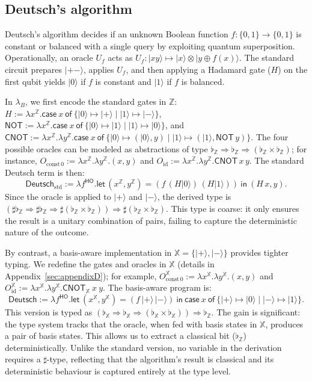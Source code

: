 \documentclass[a4paper,UKenglish,numberwithinsect,pdfa,anonymous]{lipics-v2021}
\theoremstyle{restatestyle}
\newcommand\ket[1]{\ensuremath{|#1\rangle}}
\newcommand\AbsBasis{\ensuremath{\mathsf{H\!O}}}
\def\Pair#1#2{(#1,#2)} %
\def\Lam#1#2#3{\lambda#1^{#2}{.}#3} %
\def\letkeyword{\mathsf{let}}
\def\inkeyword{\mathsf{in}}
\def\LetP#1#2#3#4#5#6{\letkeyword\,\Pair{#1^{#2}}{#3^{#4}}=#5~\inkeyword~#6}
\def\case#1#2#3#4#5{\ensuremath{\mathsf{case}~#1~\mathsf{of}~\{#2\mapsto #4 \mid #3\mapsto #5\}}}
\def\Arr{\Rightarrow}
\newcommand\B{\mathbb Z}
\newcommand\XB{\mathbb X}
\newcommand{\cnotXB}[2]{\mathsf{CNOT}_{\XB}\ #1\ #2}
\newcommand{\lambdaB}{\lambda_B}
\newcommand\basis[1]{\ensuremath{\flat_{#1}}}
\begin{document}
\subsection{Deutsch's algorithm}\label{subsec:deutsch}
Deutsch's algorithm decides if an unknown Boolean function $f:\{0,1\}\to\{0,1\}$ is constant or balanced with a single query by exploiting quantum superposition. Operationally, an oracle $U_f$ acts as $U_f:\ket{xy}\mapsto \ket{x}\otimes\ket{y\oplus f(x)}$. The standard circuit prepares $\ket{+-}$, applies $U_f$, and then applying a Hadamard gate ($H$) on the first qubit yields $\ket{0}$ if $f$ is constant and $\ket{1}$ if $f$ is balanced.

In $\lambdaB$, we first encode the standard gates in $\B$: 
$H := \Lam{x}{\B}{\case{x}{\ket{0}}{\ket{1}}{\ket{+}}{\ket{-}}}$, 
$\mathsf{NOT} := \Lam{x}{\B}{\case{x}{\ket{0}}{\ket{1}}{\ket{1}}{\ket{0}}}$, and 
$\mathsf{CNOT} := \Lam{x}{\B}{\Lam{y}{\B}{\case{x}{\ket{0}}{\ket{1}}{\Pair{\ket{0}}{y}}{\Pair{\ket{1}}{\mathsf{NOT}\,y}}}}$.
The four possible oracles can be modeled as abstractions of type $\basis{\B}\Arr\basis{\B}\Arr(\basis{\B}\times\basis{\B})$; for instance, 
$O_{\mathrm{const}\,0} := \Lam{x}{\B}{\Lam{y}{\B}{\Pair{x}{y}}}$ and 
$O_{\mathrm{id}} := \Lam{x}{\B}{\Lam{y}{\B}{\mathsf{CNOT}\,x\,y}}$. 
The standard Deutsch term is then:
\[
  \mathsf{Deutsch}_{\mathrm{std}} :=
  \Lam{f}{\AbsBasis}{
    \LetP{x}{\B}{y}{\B}{(f\,(H\ket{0})\,(H\ket{1}))}{\Pair{H\,x}{y}}
  }.
\]
Since the oracle is applied to $\ket{+}$ and $\ket{-}$, the derived type is 
$(\sharp\basis{\B}\Arr\sharp\basis{\B}\Arr \sharp(\basis{\B}\times\basis{\B})) \Arr \sharp(\basis{\B}\times\basis{\B})$. 
This type is coarse: it only ensures the result is a unitary combination of pairs, failing to capture the deterministic nature of the outcome.

By contrast, a basis-aware implementation in $\XB=\{\ket{+},\ket{-}\}$ provides tighter typing. We redefine the gates and oracles in $\XB$ (details in Appendix~\ref{sec:appendixD}); for example, 
$O_{\mathrm{const}\,0}^{\XB} := \Lam{x}{\XB}{\Lam{y}{\XB}{\Pair{x}{y}}}$ and 
$O_{\mathrm{id}}^{\XB} := \Lam{x}{\XB}{\Lam{y}{\XB}{\cnotXB{x}{y}}}$. The basis-aware program is:
\[
\mathsf{Deutsch} := \Lam{f}{\AbsBasis}{ \LetP{x}{\XB}{y}{\XB}{(f\,\ket{+}\,\ket{-})}
{\case{x}{\ket{+}}{\ket{-}}{\ket{0}}{\ket{1}}}}.
\]
This version is typed as $(\basis{\XB}\Arr\basis{\XB}\Arr(\basis{\XB}\times\basis{\XB}))\Arr\basis{\B}$. 
The gain is significant: the type system tracks that the oracle, when fed with basis states in $\XB$, produces a pair of basis states. This allows us to extract a classical bit ($\basis{\B}$) deterministically. Unlike the standard version, no variable in the derivation requires a $\sharp$-type, reflecting that the algorithm's result is classical and its deterministic behaviour is captured entirely at the type level.
\end{document}
